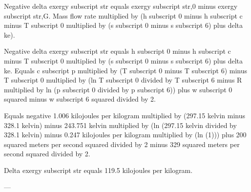Negative delta exergy subscript str equals exergy subscript str,0 minus exergy subscript str,G.  
Mass flow rate multiplied by (h subscript 0 minus h subscript c minus T subscript 0 multiplied by (s subscript 0 minus s subscript 6) plus delta ke).  

Negative delta exergy subscript str equals h subscript 0 minus h subscript c minus T subscript 0 multiplied by (s subscript 0 minus s subscript 6) plus delta ke.  
Equals c subscript p multiplied by (T subscript 0 minus T subscript 6) minus T subscript 0 multiplied by (ln T subscript 0 divided by T subscript 6 minus R multiplied by ln (p subscript 0 divided by p subscript 6)) plus w subscript 0 squared minus w subscript 6 squared divided by 2.  

Equals negative 1.006 kilojoules per kilogram multiplied by (297.15 kelvin minus 328.1 kelvin) minus 243.751 kelvin multiplied by (ln (297.15 kelvin divided by 328.1 kelvin) minus 0.247 kilojoules per kilogram multiplied by (ln (1))) plus 200 squared meters per second squared divided by 2 minus 329 squared meters per second squared divided by 2.  

Delta exergy subscript str equals 119.5 kilojoules per kilogram.  

---